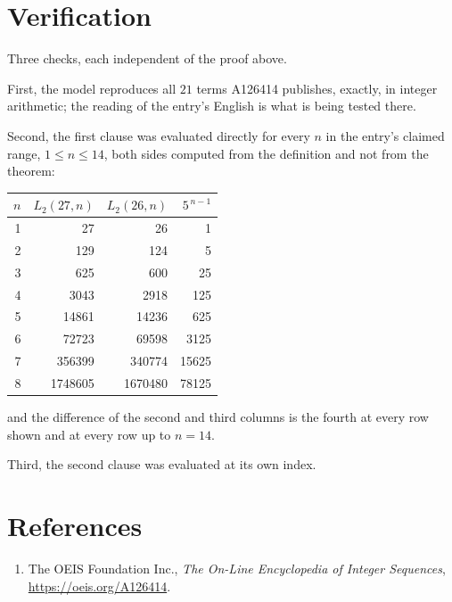 \documentclass[11pt,a4paper]{article}
\theoremstyle{plain}
\theoremstyle{definition}
\begin{document}
\section{Verification}

Three checks, each independent of the proof above.

First, the model reproduces all $21$ terms A126414 publishes, exactly, in integer
arithmetic; the reading of the entry's English is what is being tested there.

Second, the first clause was evaluated directly for every $n$ in the entry's claimed range,
$1\le n\le14$, both sides computed from the definition and not from the theorem:

\begin{center}
\begin{tabular}{rrrr}
$n$ & $L_{2}(27,n)$ & $L_{2}(26,n)$ & $5^{\,n-1}$ \\ \hline
1 & 27 & 26 & 1 \\
2 & 129 & 124 & 5 \\
3 & 625 & 600 & 25 \\
4 & 3043 & 2918 & 125 \\
5 & 14861 & 14236 & 625 \\
6 & 72723 & 69598 & 3125 \\
7 & 356399 & 340774 & 15625 \\
8 & 1748605 & 1670480 & 78125 \\
\end{tabular}
\end{center}

\noindent and the difference of the second and third columns is the fourth at every row shown
and at every row up to $n=14$.

Third, the second clause was evaluated at its own index.

\section*{References}
\begin{enumerate}
\item The OEIS Foundation Inc., \emph{The On-Line Encyclopedia of Integer Sequences},
\url{https://oeis.org/A126414}.
\end{enumerate}
\end{document}
